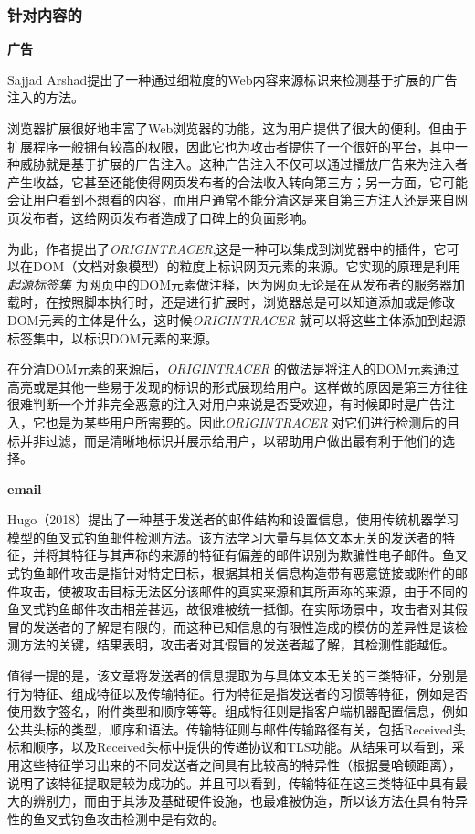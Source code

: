 \documentclass[12pt]{article} %
\begin{document}
\subsubsection{针对内容的}
\label{content}

\textbf{广告}

Sajjad Arshad提出了一种通过细粒度的Web内容来源标识来检测基于扩展的广告注入的方法。

浏览器扩展很好地丰富了Web浏览器的功能，这为用户提供了很大的便利。但由于扩展程序一般拥有较高的权限，因此它也为攻击者提供了一个很好的平台，其中一种威胁就是基于扩展的广告注入。这种广告注入不仅可以通过播放广告来为注入者产生收益，它甚至还能使得网页发布者的合法收入转向第三方；另一方面，它可能会让用户看到不想看的内容，而用户通常不能分清这是来自第三方注入还是来自网页发布者，这给网页发布者造成了口碑上的负面影响。

为此，作者提出了\textit{ORIGINTRACER},这是一种可以集成到浏览器中的插件，它可以在DOM（文档对象模型）的粒度上标识网页元素的来源。它实现的原理是利用 \textit{起源标签集} 为网页中的DOM元素做注释，因为网页无论是在从发布者的服务器加载时，在按照脚本执行时，还是进行扩展时，浏览器总是可以知道添加或是修改DOM元素的主体是什么，这时候\textit{ORIGINTRACER} 就可以将这些主体添加到起源标签集中，以标识DOM元素的来源。

在分清DOM元素的来源后，\textit{ORIGINTRACER} 的做法是将注入的DOM元素通过高亮或是其他一些易于发现的标识的形式展现给用户。这样做的原因是第三方往往很难判断一个并非完全恶意的注入对用户来说是否受欢迎，有时候即时是广告注入，它也是为某些用户所需要的。因此\textit{ORIGINTRACER} 对它们进行检测后的目标并非过滤，而是清晰地标识并展示给用户，以帮助用户做出最有利于他们的选择。

\textbf{email}

Hugo（2018）提出了一种基于发送者的邮件结构和设置信息，使用传统机器学习模型的鱼叉式钓鱼邮件检测方法。该方法学习大量与具体文本无关的发送者的特征，并将其特征与其声称的来源的特征有偏差的邮件识别为欺骗性电子邮件。鱼叉式钓鱼邮件攻击是指针对特定目标，根据其相关信息构造带有恶意链接或附件的邮件攻击，使被攻击目标无法区分该邮件的真实来源和其所声称的来源，由于不同的鱼叉式钓鱼邮件攻击相差甚远，故很难被统一抵御。在实际场景中，攻击者对其假冒的发送者的了解是有限的，而这种已知信息的有限性造成的模仿的差异性是该检测方法的关键，结果表明，攻击者对其假冒的发送者越了解，其检测性能越低。

值得一提的是，该文章将发送者的信息提取为与具体文本无关的三类特征，分别是行为特征、组成特征以及传输特征。行为特征是指发送者的习惯等特征，例如是否使用数字签名，附件类型和顺序等等。组成特征则是指客户端机器配置信息，例如公共头标的类型，顺序和语法。传输特征则与邮件传输路径有关，包括Received头标和顺序，以及Received头标中提供的传递协议和TLS功能。从结果可以看到，采用这些特征学习出来的不同发送者之间具有比较高的特异性（根据曼哈顿距离），说明了该特征提取是较为成功的。并且可以看到，传输特征在这三类特征中具有最大的辨别力，而由于其涉及基础硬件设施，也最难被伪造，所以该方法在具有特异性的鱼叉式钓鱼攻击检测中是有效的。
\end{document}

